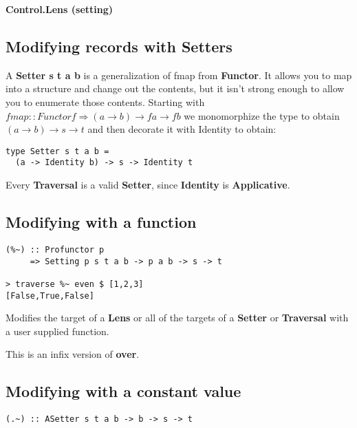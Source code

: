 {\huge \bfseries Control.Lens (setting) \\[0.2cm]}

\HRule%

\begin{multicols}{2}

\begin{box1}
\subsection *{Modifying records with Setters}
A \textbf{Setter s t a b} is a generalization of fmap from \textbf{Functor}. It
allows you to map into a structure and change out the contents, but it isn't
strong enough to allow you to enumerate those contents. Starting with
$fmap :: Functor f \Rightarrow (a \to b) \to f a \to f b$ we monomorphize the type
to obtain $(a \to b) \to s \to t$ and then decorate it with Identity to obtain:

\begin{verbatim}
type Setter s t a b =
  (a -> Identity b) -> s -> Identity t
\end{verbatim}

Every \textbf{Traversal} is a valid \textbf{Setter}, since \textbf{Identity} is
\textbf{Applicative}.

\end{box1}

\begin{box2}
\subsection *{Modifying with a function}
\begin{verbatim}
(%~) :: Profunctor p
     => Setting p s t a b -> p a b -> s -> t

> traverse %~ even $ [1,2,3]
[False,True,False]
\end{verbatim}

Modifies the target of a \textbf{Lens} or all of the targets of a
\textbf{Setter} or \textbf{Traversal} with a user supplied function.

This is an infix version of \textbf{over}.
\end{box2}

\begin{box1}
\subsection *{Modifying with a constant value}
\begin{verbatim}
(.~) :: ASetter s t a b -> b -> s -> t


\end{verbatim}
\end{box1}
\end{multicols}
